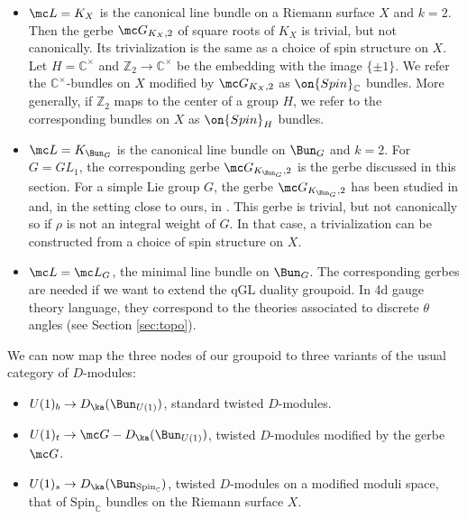 \documentclass[11pt,reqno]{amsart}
\theoremstyle{plain}
\numberwithin{equation}{section}
\newcommand{\C}{\mathbb{C}}
\newcommand{\Z}{\mathbb{Z}}
\theoremstyle{definition}
\begin{document}
\begin{itemize}

\item ${\mc L}=K_X$ is the canonical line bundle on a Riemann surface
  $X$ and $k=2$. Then the gerbe ${\mc G}_{K_X,2}$ of square roots of
  $K_X$ is trivial, but not canonically. Its trivialization is the
  same as a choice of spin structure on $X$. Let $H=\C^\times$ and
  $\Z_2 \to \C^\times$ be the embedding with the image $\{ \pm 1
  \}$. We refer the $\C^\times$-bundles on $X$ modified by ${\mc
    G}_{K_X,2}$ as $\on{Spin}_\C$ bundles. More generally, if $\Z_2$
  maps to the center of a group $H$, we refer to the corresponding
  bundles on $X$ as $\on{Spin}_H$ bundles.

\medskip

\item ${\mc L}=K_{\Bun_G}$ is the canonical line bundle on $\Bun_G$
  and $k=2$. For $G=GL_1$, the corresponding gerbe ${\mc
    G}_{K_{\Bun_G},2}$ is the gerbe discussed in this section. For a
  simple Lie group $G$, the gerbe ${\mc G}_{K_{\Bun_G},2}$ has been
  studied in \cite{BD} and, in the setting close to ours, in
  \cite{FW2}. This gerbe is trivial, but not canonically so if $\rho$
  is not an integral weight of $G$. In that case, a trivialization can
  be constructed from a choice of spin structure on $X$.

\medskip

\item ${\mc L}={\mc L}_G$, the minimal line bundle on $\Bun_G$. The
  corresponding gerbes are needed if we want to extend the qGL duality
  groupoid. In 4d gauge theory language, they correspond to the
  theories associated to discrete $\theta$ angles (see Section
  \ref{sec:topo}).

\end{itemize}

\medskip

We can now map the three nodes of our groupoid to three variants of
the usual category of $D$-modules:

\medskip

\begin{itemize}
\item $U(1)_b \to D_{\ka}(\Bun_{U(1)})$, standard twisted $D$-modules.

\medskip

\item $U(1)_t \to {\mc G}-D_{\ka}(\Bun_{U(1)})$, twisted $D$-modules
  modified by the gerbe ${\mc G}$.

\medskip

\item $U(1)_s \to D_{\ka}(\Bun_{\mathrm{Spin}_\C})$, twisted $D$-modules
  on a modified moduli space, that of $\mathrm{Spin}_\C$ bundles on the
  Riemann surface $X$.
\end{itemize}
\end{document}
